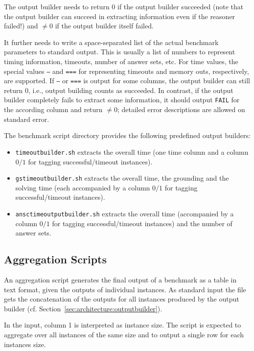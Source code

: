 \documentclass[a4paper]{article}
\begin{document}
			The output builder needs to return $0$ if the output builder succeeded (note that the output builder can succeed in extracting information even if the reasoner failed!)
			and $\not=0$ if the output builder itself failed.
			
			It further needs to write a space-separated list of the actual benchmark parameters to standard output.
			This is usually a list of numbers to represent timing information, timeouts, number of answer sets, etc. For time values,
			the special values {\tt ---} and {\tt ===} for representing timeouts and memory outs, respectively, are supported.
			If {\tt ---} or {\tt ===} is output for some columns, the output builder can still return $0$, i.e.,
			output building counts as succeeded.
			In contrast, if the output builder completely fails to extract some information, it should output {\tt FAIL} for the according column
			and return $\not=0$; detailed error descriptions are allowed on standard error.
			
			The benchmark script directory provides the following predefined output builders:
					
			\begin{itemize}
			    \item {\tt timeoutbuilder.sh} extracts the overall time (one time column and a column $0/1$ for tagging successful/timeout instances).
			    \item {\tt gstimeoutbuilder.sh} extracts the overall time, the grounding and the solving time (each accompanied by a column $0/1$ for tagging successful/timeout instances).
			    \item {\tt ansctimeoutputbuilder.sh} extracts the overall time (accompanied by a column $0/1$ for tagging successful/timeout instances) and the number of answer sets.
			\end{itemize}
	
		\subsection{Aggregation Scripts}
		\label{sec:architecture:aggregate}
	
			An aggregation script
		    generates the final output of a benchmark as a table in text format,
		    given the outputs of individual instances.
		    As standard input the file gets the concatenation of the outputs for all instances produced by the output builder (cf. Section~\ref{sec:architecture:outputbuilder}).
	
			In the input, column 1 is interpreted as instance size. The script is expected to aggregate
			over all instances of the same size and to output a single row for each instances size.
	
\end{document}
